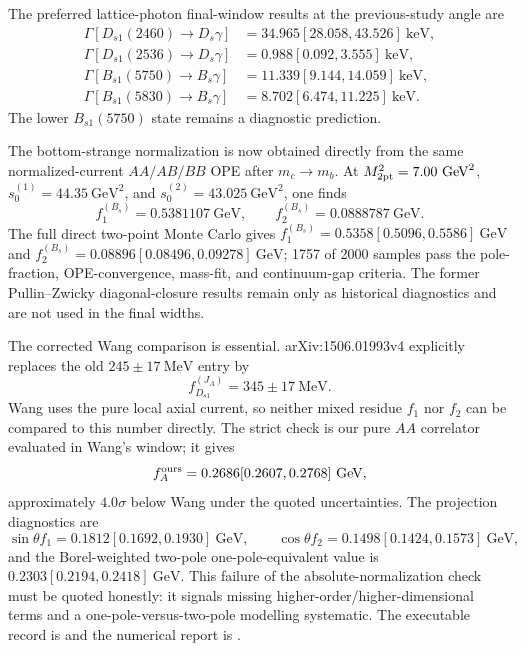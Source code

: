 \documentclass[11pt]{article}
\newcommand{\GeV}{\mathrm{GeV}}
\begin{document}
The preferred lattice-photon final-window results at the previous-study angle
are
\begin{align}
\Gamma[D_{s1}(2460)\to D_s\gamma]
 &=34.965[28.058,43.526]~\mathrm{keV},\\
\Gamma[D_{s1}(2536)\to D_s\gamma]
 &=0.988[0.092,3.555]~\mathrm{keV},\\
\Gamma[B_{s1}(5750)\to B_s\gamma]
 &=11.339[9.144,14.059]~\mathrm{keV},\\
\Gamma[B_{s1}(5830)\to B_s\gamma]
 &=8.702[6.474,11.225]~\mathrm{keV}.
\end{align}
The lower $B_{s1}(5750)$ state remains a diagnostic prediction.

The bottom-strange normalization is now obtained directly from the same
normalized-current $AA/AB/BB$ OPE after $m_c\to m_b$.  At
$M_{\rm 2pt}^2=7.00~\GeV^2$,
$s_0^{(1)}=44.35~\GeV^2$, and
$s_0^{(2)}=43.025~\GeV^2$, one finds
\begin{equation}
 f_1^{(B_s)}=0.5381107~\GeV,\qquad
 f_2^{(B_s)}=0.0888787~\GeV .
\end{equation}
The full direct two-point Monte Carlo gives
$f_1^{(B_s)}=0.5358[0.5096,0.5586]~\GeV$ and
$f_2^{(B_s)}=0.08896[0.08496,0.09278]~\GeV$; 1757 of 2000 samples pass the
pole-fraction, OPE-convergence, mass-fit, and continuum-gap criteria.  The
former Pullin--Zwicky diagonal-closure results remain only as historical
diagnostics and are not used in the final widths.

The corrected Wang comparison is essential.  arXiv:1506.01993v4 explicitly
replaces the old $245\pm17~\mathrm{MeV}$ entry by
\begin{equation}
f_{D_{s1}}^{(J_A)}=345\pm17~\mathrm{MeV}.
\end{equation}
Wang uses the pure local axial current, so neither mixed residue $f_1$ nor
$f_2$ can be compared to this number directly.  The strict check is our pure
$AA$ correlator evaluated in Wang's window; it gives
\begin{equation}
f_A^{\rm ours}=0.2686[0.2607,0.2768]~\GeV,
\end{equation}
approximately $4.0\sigma$ below Wang under the quoted uncertainties.  The
projection diagnostics are
\begin{equation}
\sin\theta f_1=0.1812[0.1692,0.1930]~\GeV,\qquad
\cos\theta f_2=0.1498[0.1424,0.1573]~\GeV,
\end{equation}
and the Borel-weighted two-pole one-pole-equivalent value is
$0.2303[0.2194,0.2418]~\GeV$.  This failure of the absolute-normalization check
must be quoted honestly: it signals missing higher-order/higher-dimensional
terms and a one-pole-versus-two-pole modelling systematic.  The executable
record is  and the numerical report
is .
\end{document}
